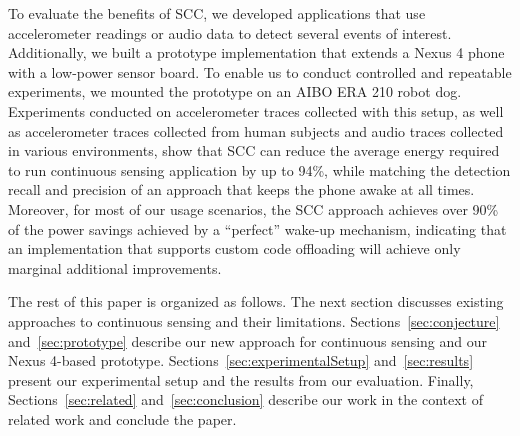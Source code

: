 To evaluate the benefits of SCC, we developed applications that use 
accelerometer readings or audio data to detect several events of 
interest.  Additionally, we built a prototype implementation that extends 
a Nexus 4 phone with a low-power sensor board.  To enable us to 
conduct controlled and repeatable experiments,
we mounted the prototype on an AIBO ERA 210 robot dog.  Experiments 
conducted on accelerometer traces collected with this setup,
as well as accelerometer traces collected from human subjects and audio
traces collected in various environments, show that
SCC can reduce the average energy required to run continuous
sensing application by up to 94\%, while matching the detection recall
and precision of an approach that keeps the phone awake at all times.
Moreover, for most of our usage scenarios, the SCC approach
achieves over 90\% of the power savings achieved by a ``perfect''
wake-up mechanism, indicating that an implementation that supports
custom code offloading will achieve only marginal additional
improvements.

The rest of this paper is organized as follows.
The next section discusses existing approaches to
continuous sensing and their limitations.  Sections~\ref{sec:conjecture}
and~\ref{sec:prototype} describe our new approach for continuous sensing
and our Nexus 4-based prototype.  Sections~\ref{sec:experimentalSetup} 
and~\ref{sec:results} present our
experimental setup and the results from our evaluation.  Finally,
Sections~\ref{sec:related} and~\ref{sec:conclusion} describe our work
in the context of related work and conclude the paper.

